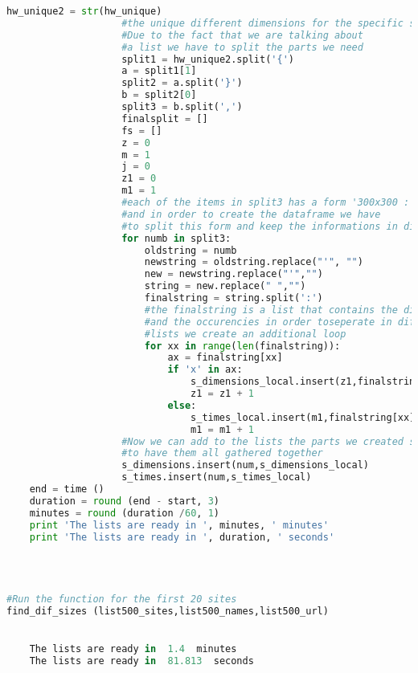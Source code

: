 \documentclass{article}
\begin{document}
\begin{lstlisting}[language=Python]
                    hw_unique2 = str(hw_unique) 
                    #the unique different dimensions for the specific site
                    #Due to the fact that we are talking about 
                    #a list we have to split the parts we need 
                    split1 = hw_unique2.split('{')
                    a = split1[1]
                    split2 = a.split('}')
                    b = split2[0]
                    split3 = b.split(',')
                    finalsplit = []
                    fs = []
                    z = 0
                    m = 1
                    j = 0
                    z1 = 0
                    m1 = 1
                    #each of the items in split3 has a form '300x300 : 15'
                    #and in order to create the dataframe we have 
                    #to split this form and keep the informations in different list
                    for numb in split3:                
                        oldstring = numb
                        newstring = oldstring.replace("'", "")
                        new = newstring.replace("'","")
                        string = new.replace(" ","")
                        finalstring = string.split(':')
                        #the finalstring is a list that contains the dimensions
                        #and the occurencies in order toseperate in different
                        #lists we create an additional loop
                        for xx in range(len(finalstring)):
                            ax = finalstring[xx]
                            if 'x' in ax:
                                s_dimensions_local.insert(z1,finalstring[xx])
                                z1 = z1 + 1
                            else:
                                s_times_local.insert(m1,finalstring[xx])
                                m1 = m1 + 1  
                    #Now we can add to the lists the parts we created so as
                    #to have them all gathered together             
                    s_dimensions.insert(num,s_dimensions_local)
                    s_times.insert(num,s_times_local)                
    end = time ()
    duration = round (end - start, 3)
    minutes = round (duration /60, 1)
    print 'The lists are ready in ', minutes, ' minutes'
    print 'The lists are ready in ', duration, ' seconds'
 


 
#Run the function for the first 20 sites
find_dif_sizes (list500_sites,list500_names,list500_url)
 

    The lists are ready in  1.4  minutes
    The lists are ready in  81.813  seconds
    



\end{lstlisting}
\end{document}
